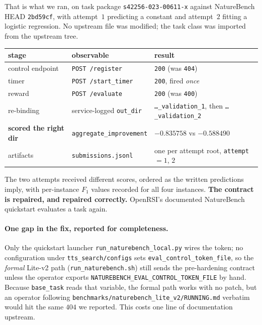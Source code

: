 That is what we ran, on task package \texttt{s42256-023-00611-x} against NatureBench HEAD
\texttt{2bd59cf}, with attempt~$1$ predicting a constant and attempt~$2$ fitting a logistic
regression. No upstream file was modified; the task class was imported from the upstream tree.

\begin{center}
\begin{tabular}{lll}
\toprule
stage & observable & result \\
\midrule
control endpoint & \texttt{POST /register} & \texttt{200} (was \texttt{404}) \\
timer & \texttt{POST /start\_timer} & \texttt{200}, fired \emph{once} \\
reward & \texttt{POST /evaluate} & \texttt{200} (was \texttt{400}) \\
re-binding & service-logged \texttt{out\_dir} & \texttt{\dots\_validation\_1}, then \texttt{\dots\_validation\_2} \\
\textbf{scored the right dir} & \texttt{aggregate\_improvement} & $-0.835758$ vs $-0.588490$ \\
artifacts & \texttt{submissions.jsonl} & one per attempt root, \texttt{attempt}$=1$, $2$ \\
\bottomrule
\end{tabular}
\end{center}

The two attempts received different scores, ordered as the written predictions imply, with
per-instance $F_1$ values recorded for all four instances. \textbf{The contract is repaired,
and repaired correctly.} OpenRSI's documented NatureBench quickstart evaluates a task again.

\paragraph{One gap in the fix, reported for completeness.}
Only the quickstart launcher \texttt{run\_naturebench\_local.py} wires the token; no
configuration under \texttt{tts\_search/configs} sets \texttt{eval\_control\_token\_file}, so
the \emph{formal} Lite-v2 path (\texttt{run\_naturebench.sh}) still sends the pre-hardening
contract unless the operator exports \texttt{NATUREBENCH\_EVAL\_CONTROL\_TOKEN\_FILE} by
hand. Because \texttt{base\_task} reads that variable, the formal path works with no patch,
but an operator following \texttt{benchmarks/naturebench\_lite\_v2/RUNNING.md} verbatim would
hit the same $404$ we reported. This costs one line of documentation upstream.

